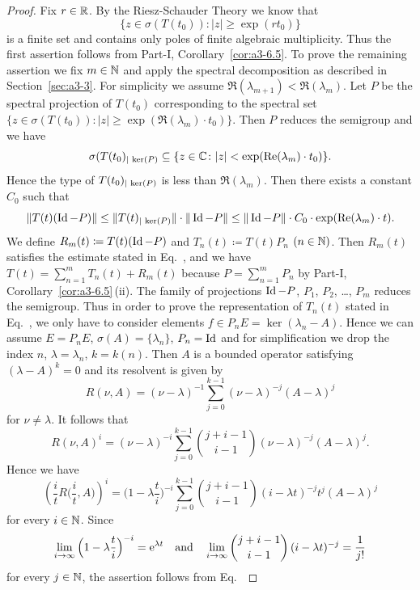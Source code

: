 \begin{proof}
	Fix $r \in \mathbb{R}$.
	By the Riesz-Schauder Theory we know that
	\[
    \{z \in \sigma(T(t_{0})) \colon |z| \geq \exp(rt_{0})\}
    \]
    is a finite set and contains only
	poles of finite algebraic multiplicity.
	Thus the first assertion
	follows from Part-I, Corollary~\ref{cor:a3-6.5}.
	To prove the remaining assertion we fix $m \in \mathbb{N}$ and apply the spectral
	decomposition as described in Section~\ref{sec:a3-3}.
	For simplicity we assume $\Re(\lambda_{m+1}) < \Re(\lambda_m)$.
	Let $P$ be the spectral projection
	of\/ $T(t_{0})$ corresponding to the spectral set $\{z \in \sigma(T(t_{0})) :
	|z| \geq \exp(\Re(\lambda_m) \cdot t_{0})\}$.
	Then $P$ reduces the semigroup and we have
	\[
	\sigma(T(t_{0})_{\vert \mathop{}\mathrm{ker}(P)} \subseteq \{z \in \mathbb{C} \colon |z| < \exp(\mathop{}\!\mathrm{Re}(\lambda_m) \cdot t_{0})\} .
\]
%
	Hence the type of
	$T(t_{0})_{\vert \mathop{}\mathrm{ker}(P)} $ is less than $\Re(\lambda_m)$.
	Then there exists a constant $C_{0}$ such that
\[
\|T(t)(\Id -P)\| \leq \|T(t)_{\vert \Kern{P}}\|\cdot\|\Id -P\| \leq \|\Id -P\|\cdot C_{0} \cdot \exp(\Re(\lambda_m) \cdot t) .
\]
We define $R_m(t)  \coloneq  T(t)(\operatorname{Id} -P)$ and $T_n(t)  \coloneq  T(t)P_n$ $(n \in \mathbb{N})$.
Then $R_m(t)$ satisfies the estimate stated in Eq.~, and we have $T(t) =
\sum_{n=1}^m T_n(t) + R_m(t)$ because $P = \sum_{n=1}^m P_n$ by Part-I, Corollary~\ref{cor:a3-6.5}\,(ii).
The family of projections $\operatorname{Id} -P$, $P_1$, $P_2$, \ldots , $P_m$ reduces the semigroup.
Thus in order to prove the representation of\/ $T_n(t)$ stated in
Eq.~, we only have to consider elements $f \in P_n E = \ker(\lambda_n-A)$.
Hence we can assume $E = P_n E$, $\sigma(A) = \{\lambda_n\}$, $P_n = \operatorname{Id} $ and for simplification
we drop the index $n$, \ie  $\lambda = \lambda_n$, $k = k(n)$.
Then $A$ is a bounded operator satisfying $(\lambda - A)^k = 0$ and its resolvent is given by
%
\[
	R(\nu,A) = (\nu-\lambda)^{-1}\sum_{j=0}^{k-1}(\nu-\lambda)^{-j}(A-\lambda)^j
\]
%
for $\nu \neq \lambda$.
It follows that
%
\[
	 R(\nu,A)^i = (\nu-\lambda)^{-i}\sum_{j=0}^{k-1}\binom{j+i-1}{i-1}(\nu-\lambda)^{-j}(A-\lambda)^j .
\]
Hence we have
\[
\left(\frac{i}{t}R\Big(\frac{i}{t},A\Big)\right)^i = \Big(1-\lambda\frac{t}{i}\Big)^{-i}\sum_{j=0}^{k-1}\binom{j+i-1}{i-1}(i-\lambda t)^{-j}t^j(A-\lambda)^j 
\]
for every $i \in \mathbb{N}$.
Since 
%
\[
\lim_{i\to\infty}\Big(1-\lambda\frac{t}{i}\Big)^{-i} = \mathrm{e}^{\lambda t}
\quad \text{and} \quad \lim_{i\to\infty}\binom{j+i-1}{i-1}\,(i-\lambda t)^{-j} = \frac{1}{j!}
\]
%
for every $j \in \mathbb{N}$, the assertion follows from Eq.~
\end{proof}

